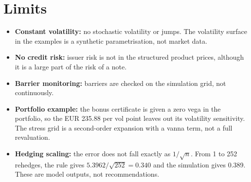 \documentclass[11pt,a4paper]{article}
\begin{document}
\section{Limits}
\begin{itemize}
\item \textbf{Constant volatility:} no stochastic volatility or jumps. The volatility surface in the examples is a synthetic parametrisation, not market data.
\item \textbf{No credit risk:} issuer risk is not in the structured product prices, although it is a large part of the risk of a note.
\item \textbf{Barrier monitoring:} barriers are checked on the simulation grid, not continuously.
\item \textbf{Portfolio example:} the bonus certificate is given a zero vega in the portfolio, so the EUR 235.88 per vol point leaves out its volatility sensitivity. The stress grid is a second-order expansion with a vanna term, not a full revaluation.
\item \textbf{Hedging scaling:} the error does not fall exactly as $1/\sqrt n$. From 1 to 252 rehedges, the rule gives $5.3962/\sqrt{252}=0.340$ and the simulation gives 0.389. These are model outputs, not recommendations.
\end{itemize}
\end{document}
